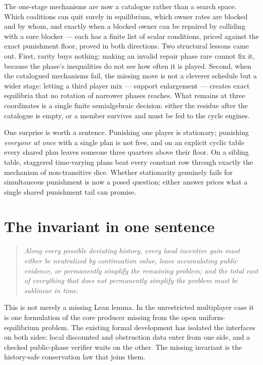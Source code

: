 \documentclass[11pt]{article}
\begin{document}
The one-stage mechanisms are now a catalogue rather than a search space.
Which coalitions can quit surely in equilibrium, which owner rates are
blocked and by whom, and exactly when a blocked owner can be repaired by
colliding with a sure blocker --- each has a finite list of scalar
conditions, priced against the exact punishment floor, proved in both
directions.  Two structural lessons came out.  First, rarity buys nothing:
making an invalid repair phase rare cannot fix it, because the phase's
inequalities do not see how often it is played.  Second, when the
catalogued mechanisms fail, the missing move is not a cleverer schedule but
a wider stage: letting a third player mix --- support enlargement --- creates
exact equilibria that no rotation of narrower phases reaches.  What remains
at three coordinates is a single finite semialgebraic decision: either the
residue after the catalogue is empty, or a member survives and must be fed
to the cycle engines.

One surprise is worth a sentence.  Punishing one player is stationary;
punishing \emph{everyone at once} with a single plan is not free, and on an
explicit cyclic table every shared plan leaves someone three quarters above
their floor.  On a sibling table, staggered time-varying plans beat every
constant row through exactly the mechanism of non-transitive dice.  Whether
stationarity genuinely fails for simultaneous punishment is now a posed
question; either answer prices what a single shared punishment tail can
promise.

\section{The invariant in one sentence}

\begin{quote}
\emph{Along every possible deviating history, every local incentive gain
must either be neutralized by continuation value, leave accumulating public
evidence, or permanently simplify the remaining problem; and the total cost
of everything that does not permanently simplify the problem must be
sublinear in time.}
\end{quote}

This is not merely a missing Lean lemma.  In the unrestricted multiplayer
case it is one formulation of the core producer missing from the open
uniform-equilibrium problem.
The existing formal development has isolated the interfaces on both sides:
local discounted and obstruction data enter from one side, and a checked
public-phase verifier waits on the other.  The missing invariant is the
history-safe conservation law that joins them.
\end{document}

